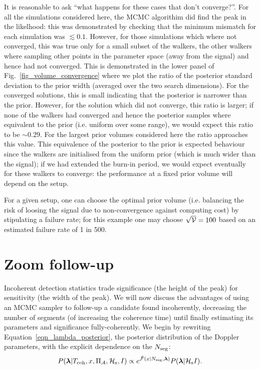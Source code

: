 \documentclass[aps, prd, twocolumn, superscriptaddress, floatfix, showpacs, nofootinbib, longbibliography]{revtex4-1}
\begin{document}
It is reasonable to ask ``what happens for these cases that don't converge?''.
For all the simulations considered here, the MCMC algorithim did find the peak
in the likelhood: this was demonstrated by checking that the minimum mismatch
for each simulation was $\lesssim 0.1$. However, for those simulations which
where not converged, this was true only for a small subset of the walkers, the
other walkers where sampling other points in the parameter space (away from the
signal) and hence had not converged. This is demonstrated in the lower panel of
Fig.~\ref{fig_volume_convergence} where we plot the ratio of the posterior
standard deviation to the prior width (averaged over the two search
dimensions). For the converged solutions, this is small indicating that the
posterior is narrower than the prior. However, for the solution which did not
converge, this ratio is larger; if none of the walkers had converged and hence
the posterior samples where equivalent to the prior (i.e. uniform over some
range), we would expect this ratio to be $\sim 0.29$. For the largest prior
volumes considered here the ratio approaches this value.
This equivalence of the posterior to the prior is expected behaviour since the
walkers are initialised from the uniform prior (which is much wider than the
signal); if we had extended the burn-in period, we would expect eventually for
these walkers to converge: the performance at a fixed prior volume will depend
on the setup.

For a given setup, one can choose the optimal prior volume (i.e. balancing the
risk of loosing the signal due to non-convergence against computing cost) by
stipulating a failure rate; for this example one may choose $\sqrt{\mathcal{V}}=100$ based
on an estimated failure rate of 1 in 500.


\section{Zoom follow-up}
\label{sec_follow_up}

Incoherent detection statistics trade significance (the height of the peak) for
sensitivity (the width of the peak). We will now discuss the advantages of
using an MCMC sampler to follow-up a candidate found incoherently, decreasing
the number of segments (of increasing
the coherence time) until finally estimating its parameters and significance
fully-coherently. We begin by rewriting Equation~\eqref{eqn_lambda_posterior},
the posterior distribution of the Doppler parameters, with the explicit
dependence on the $N_{\rm seg}$:
\begin{equation}
P(\boldsymbol{\mathbf{\lambda}} | T_{\rm coh}, x, \Pi_\mathcal{A}, \mathcal{H}_{\rm s}, I)
\propto e^{\hat{{\mathcal{F}}}(x| N_{\rm seg}, \boldsymbol{\mathbf{\lambda}})} P(\boldsymbol{\mathbf{\lambda}}| \mathcal{H}_{\rm s} I).
\end{equation}
\end{document}
